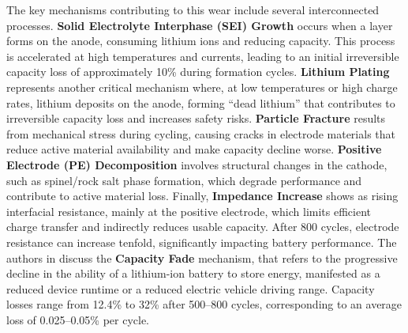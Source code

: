 The key mechanisms contributing to this wear include several interconnected processes. \textbf{Solid Electrolyte Interphase (SEI) Growth} occurs when a layer forms on the anode, consuming lithium ions and reducing capacity. This process is accelerated at high temperatures and currents, leading to an initial irreversible capacity loss of approximately 10\% during formation cycles. \textbf{Lithium Plating} represents another critical mechanism where, at low temperatures or high charge rates, lithium deposits on the anode, forming ``dead lithium'' that contributes to irreversible capacity loss and increases safety risks. \textbf{Particle Fracture} results from mechanical stress during cycling, causing cracks in electrode materials that reduce active material availability and make capacity decline worse. \textbf{Positive Electrode (PE) Decomposition} involves structural changes in the cathode, such as spinel/rock salt phase formation, which degrade performance and contribute to active material loss. Finally, \textbf{Impedance Increase} shows as rising interfacial resistance, mainly at the positive electrode, which limits efficient charge transfer and indirectly reduces usable capacity. After 800 cycles, electrode resistance can increase tenfold, significantly impacting battery performance. The authors in \cite{zhang_studies_2000} discuss the \textbf{Capacity Fade} mechanism, that refers to the progressive decline in the ability of a lithium-ion battery to store energy, manifested as a reduced device runtime or a reduced electric vehicle driving range. Capacity losses range from 12.4\% to 32\% after 500--800 cycles, corresponding to an average loss of 0.025--0.05\% per cycle.


